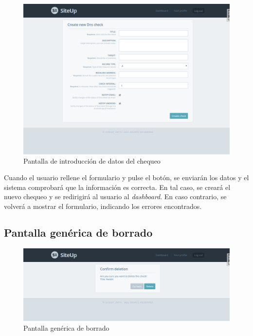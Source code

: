 \begin{figure}[htbp]
  \centering
  \includegraphics[width=\textwidth]{5_diseno/web-create-check}
  \caption{Pantalla de introducción de datos del chequeo}
  \label{fig:web-create-check}
\end{figure}


Cuando el usuario rellene el formulario y pulse el botón, se enviarán los datos
y el sistema comprobará que la información es correcta. En tal caso, se creará
el nuevo chequeo y se redirigirá al usuario al \textit{dashboard}. En caso
contrario, se volverá a mostrar el formulario, indicando los errores
encontrados.

\subsection{Pantalla genérica de borrado}

\begin{figure}[htbp]
  \centering
  \includegraphics[width=\textwidth]{5_diseno/web-delete}
  \caption{Pantalla genérica de borrado}
  \label{fig:web-delete}
\end{figure}

